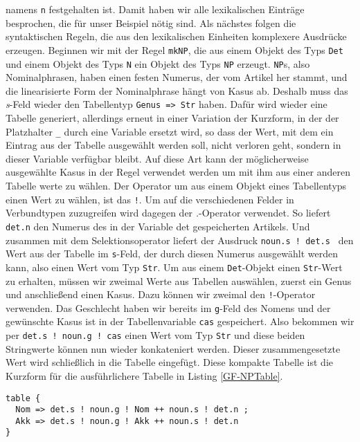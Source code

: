 \documentclass[12pt,abstract=on,titlepage,bibliography=totoc,ngerman,listof=totoc]{scrreprt}
\begin{document}
namens \texttt{n} festgehalten ist. Damit haben wir alle lexikalischen Einträge besprochen, die für unser Beispiel nötig sind. Als nächstes folgen die syntaktischen Regeln, die aus den lexikalischen Einheiten komplexere Ausdrücke erzeugen. Beginnen wir mit der Regel \texttt{mkNP}, die aus einem Objekt des Typs \texttt{Det} und einem Objekt des Typs \texttt{N} ein Objekt des Typs \texttt{NP} erzeugt. \texttt{NP}s, also Nominalphrasen, haben einen festen Numerus, der vom Artikel her stammt, und die linearisierte Form der Nominalphrase hängt von Kasus ab. Deshalb muss das \textit{s}-Feld wieder den Tabellentyp \texttt{Genus => Str} haben. Dafür wird wieder eine Tabelle generiert, allerdings erneut in einer Variation der Kurzform, in der der Platzhalter \texttt{\_} durch eine Variable ersetzt wird, so dass der Wert, mit dem ein Eintrag aus der Tabelle ausgewählt werden soll, nicht verloren geht, sondern in dieser Variable verfügbar bleibt. Auf diese Art kann der möglicherweise ausgewählte Kasus in der Regel verwendet werden um mit ihm aus einer anderen Tabelle werte zu wählen. Der Operator um aus einem Objekt eines Tabellentyps einen Wert zu wählen, ist das \texttt{!}. Um auf die verschiedenen Felder in Verbundtypen zuzugreifen wird dagegen der \textit{.}-Operator verwendet. So liefert \texttt{det.n} den Numerus des in der Variable det gespeicherten Artikels. Und zusammen mit dem Selektionsoperator liefert der Ausdruck \texttt{noun.s ! det.s } den Wert aus der Tabelle im \texttt{s}-Feld, der durch diesen Numerus ausgewählt werden kann, also einen Wert vom Typ \texttt{Str}. Um aus einem \texttt{Det}-Objekt einen \texttt{Str}-Wert zu erhalten, müssen wir zweimal Werte aus Tabellen auswählen, zuerst ein Genus und anschließend einen Kasus. Dazu können wir zweimal den \texttt{!}-Operator verwenden. Das Geschlecht haben wir bereits im \texttt{g}-Feld des Nomens und der gewünschte Kasus ist in der Tabellenvariable \texttt{cas} gespeichert. Also bekommen wir per \texttt{det.s ! noun.g ! cas} einen Wert vom Typ \texttt{Str} und diese beiden Stringwerte können nun wieder konkateniert werden. Dieser zusammengesetzte Wert wird schließlich in die Tabelle eingefügt. Diese kompakte Tabelle ist die Kurzform für die ausführlichere Tabelle in Listing \ref{GF-NPTable}.
\begin{lstlisting}[float=ht,caption={Ausführliche Form der Tabelle in Zeile 13 des Listings \ref{GF-SatzGer}},label={GF-NPTable}]
table { 
  Nom => det.s ! noun.g ! Nom ++ noun.s ! det.n ; 
  Akk => det.s ! noun.g ! Akk ++ noun.s ! det.n 
}
\end{lstlisting}
\end{document}
